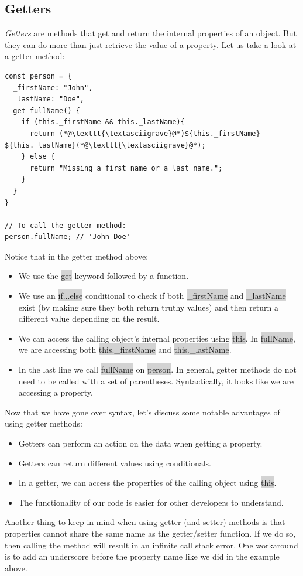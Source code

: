 \documentclass[11pt]{article}
\begin{document}
\subsection{Getters}
\textit{Getters} are methods that get and return the internal properties of an object. But they can do more than just retrieve the value of a property. Let us take a look at a getter method:
\begin{lstlisting}
const person = {
  _firstName: "John",
  _lastName: "Doe",
  get fullName() {
    if (this._firstName && this._lastName){
      return (*@\texttt{\textasciigrave}@*)${this._firstName} ${this._lastName}(*@\texttt{\textasciigrave}@*);
    } else {
      return "Missing a first name or a last name.";
    }
  }
}

// To call the getter method: 
person.fullName; // 'John Doe'
\end{lstlisting}
Notice that in the getter method above:
\begin{itemize}[leftmargin = *]
\item We use the \colorbox{lightgray}{get} keyword followed by a function.
\item We use an \colorbox{lightgray}{if...else} conditional to check if both \colorbox{lightgray}{\_firstName} and \colorbox{lightgray}{\_lastName} exist (by making sure they both return truthy values) and then return a different value depending on the result.
\item We can access the calling object’s internal properties using \colorbox{lightgray}{this}. In \colorbox{lightgray}{fullName}, we are accessing both \colorbox{lightgray}{this.\_firstName} and \colorbox{lightgray}{this.\_lastName}.
\item In the last line we call \colorbox{lightgray}{fullName} on \colorbox{lightgray}{person}. In general, getter methods do not need to be called with a set of parentheses. Syntactically, it looks like we are accessing a property.
\end{itemize}
Now that we have gone over syntax, let’s discuss some notable advantages of using getter methods:
\begin{itemize}[leftmargin = *]
\item Getters can perform an action on the data when getting a property.
\item Getters can return different values using conditionals.
\item In a getter, we can access the properties of the calling object using \colorbox{lightgray}{this}.
\item The functionality of our code is easier for other developers to understand.
\end{itemize}
Another thing to keep in mind when using getter (and setter) methods is that properties cannot share the same name as the getter/setter function. If we do so, then calling the method will result in an infinite call stack error. One workaround is to add an underscore before the property name like we did in the example above.
\end{document}
